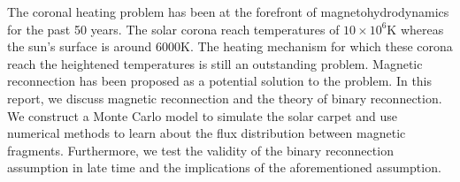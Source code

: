 The coronal heating problem has been at the forefront of magnetohydrodynamics for the past 50 years. The solar corona reach temperatures of $10\times 10^6 \text{K}$ whereas the sun's surface is around $6000 \text{K}$. The heating mechanism for which these corona reach the heightened temperatures is still an outstanding problem. Magnetic reconnection has been proposed as a potential solution to the problem. In this report, we discuss magnetic reconnection and the theory of binary reconnection. We construct a Monte Carlo model to simulate the solar carpet and use numerical methods to learn about the flux distribution between magnetic fragments. Furthermore, we test the validity of the binary reconnection assumption in late time and the implications of the aforementioned assumption.